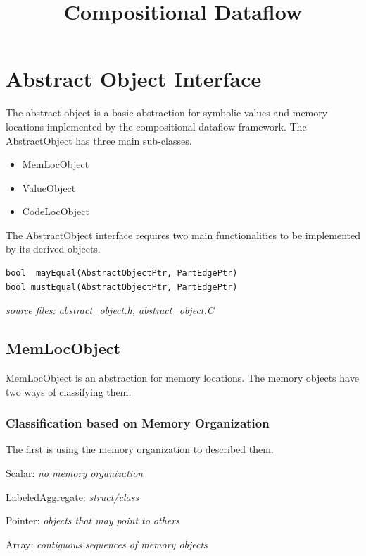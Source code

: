 \documentclass{article}
\begin{document}
\title{Compositional Dataflow}
\date{}
\maketitle
\section{Abstract Object Interface}
\noindent
The abstract object is a basic abstraction for symbolic values and
memory locations implemented by the compositional dataflow framework. The
AbstractObject has three main sub-classes. 
\begin{itemize}
\item MemLocObject 
\item ValueObject 
\item CodeLocObject
\end{itemize}
The AbstractObject interface requires two main functionalities to be
implemented by its derived objects.
\begin{lstlisting}
bool  mayEqual(AbstractObjectPtr, PartEdgePtr)
bool mustEqual(AbstractObjectPtr, PartEdgePtr)
\end{lstlisting}
\emph{source files: abstract\_object.h, abstract\_object.C}
\subsection{MemLocObject}
MemLocObject is an abstraction for memory locations. The memory
objects have two ways of classifying them. 
\subsubsection{Classification based on Memory Organization}
The first is using the
memory organization to described them.
\begin{description}
\item Scalar: \emph{no memory organization}
\item LabeledAggregate: \emph{struct/class}
\item Pointer: \emph{objects that may point to others}
\item Array: \emph{contiguous sequences of memory objects}
\end{description}
\end{document}
